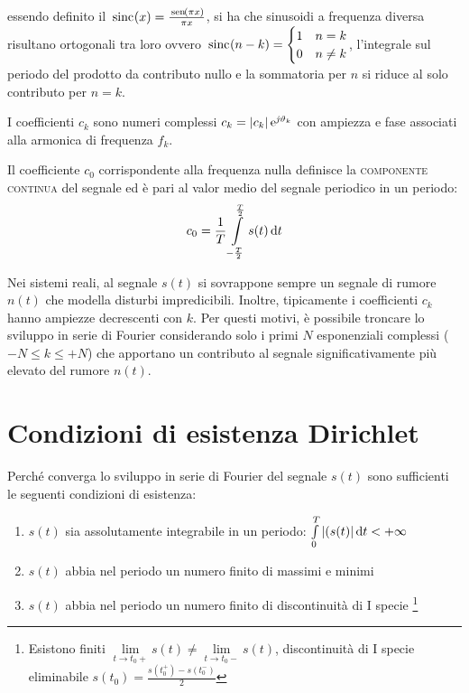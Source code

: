 essendo definito il $\,{\operatorname{sinc}}^{}\!\left({x}\right)=\frac{\,{\operatorname{sen}}^{}\!\left({\pi x}\right)}{\pi x}$, si ha che sinusoidi a frequenza diversa risultano ortogonali tra loro ovvero 
$\,{\operatorname{sinc}}^{}\!\left({n-k}\right)=\begin{cases}
	1 & n=k \\
	0 & n\neq k
\end{cases}$, l'integrale sul periodo del prodotto da contributo nullo e la sommatoria per $n$ si riduce al solo contributo per $n=k$.

I coefficienti $c_k$ sono numeri complessi $c_k=\left|{c_k}\right|\operatorname{e}^{\operatorname{\mathit{j}\!}\vartheta_k}$ con ampiezza e fase associati alla armonica di frequenza $f_k$.

Il coefficiente $c_0$ corrispondente alla frequenza nulla definisce la \textsc{componente continua} del segnale ed è pari al valor medio del segnale periodico in un periodo:
\begin{equation}
	c_0=\frac{1}{T}\int\limits_{-\frac{T}{2}}^{\frac{T}{2}}{s(t)}{\,\mathop{}\!\mathrm{d}{t}}
\end{equation}

\begin{nota}
	Nei sistemi reali, al segnale $s(t)$ si sovrappone sempre un segnale di rumore $n(t)$ che modella disturbi impredicibili. Inoltre, tipicamente i coefficienti $c_k$ hanno ampiezze decrescenti con $k$. Per questi motivi, è possibile troncare lo sviluppo in serie di Fourier considerando solo i primi $N$ esponenziali complessi ($-N\leq k \leq +N$) che apportano un contributo al segnale significativamente più elevato del rumore $n(t)$.
\end{nota}

\section{Condizioni di esistenza Dirichlet}
Perché converga lo sviluppo in serie di Fourier del segnale $s(t)$ sono sufficienti le seguenti condizioni di esistenza:
\begin{enumerate}
\item $s(t)$ sia assolutamente integrabile in un periodo: $\int\limits_{0}^{T}{\left|{(s(t)}\right|}{\,\mathop{}\!\mathrm{d}{t}}<+\infty$
\item $s(t)$ abbia nel periodo un numero finito di massimi e minimi
\item $s(t)$ abbia nel periodo un numero finito di discontinuità di I specie
\footnote{Esistono finiti $\lim\limits_{t\to t_0+}s(t)\neq\lim\limits_{t\to t_0-}s(t)$, discontinuità di I specie eliminabile $s(t_0)=\frac{s(t_0^+)-s(t_0^-)}{2}$}
\end{enumerate}

